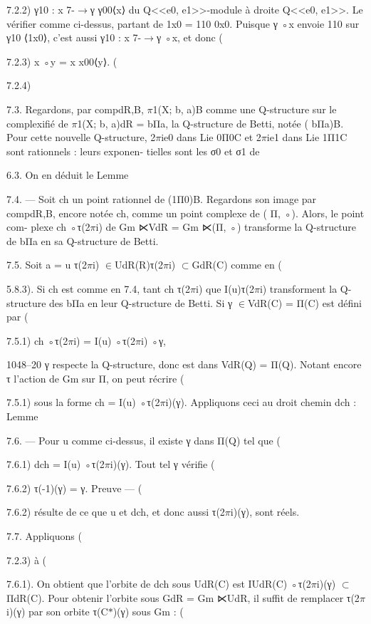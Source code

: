 \documentclass[11pt]{article}
\begin{document}
7.2.2) γ10 : x 7-\(\to\)γ γ00⟨x⟩ du Q<<e0, e1>>-module à droite Q<<e0, e1>>. Le vérifier comme ci-dessus, partant de 1x0 = 110 0x0. Puisque γ ◦x envoie 110 sur γ10 ⟨1x0⟩, c’est aussi γ10 : x 7-\(\to\)γ ◦x, et donc (

7.2.3) x ◦y = x x00⟨y⟩. (

7.2.4) 

7.3. Regardons, par compdR,B, \(\pi\)1(X; b, a)B comme une Q-structure sur le complexifié de \(\pi\)1(X; b, a)dR = bΠa, la Q-structure de Betti, notée ( bΠa)B. Pour cette nouvelle Q-structure, 2\(\pi\)ie0 dans Lie 0Π0C et 2\(\pi\)ie1 dans Lie 1Π1C sont rationnels : leurs exponen- tielles sont les σ0 et σ1 de 

6.3. On en déduit le Lemme 

7.4. --- Soit ch un point rationnel de (1Π0)B. Regardons son image par compdR,B, encore notée ch, comme un point complexe de ( Π, ◦). Alors, le point com- plexe ch ◦τ(2\(\pi\)i) de Gm ⋉VdR = Gm ⋉(Π, ◦) transforme la Q-structure de bΠa en sa Q-structure de Betti. 

7.5. Soit a = u τ(2\(\pi\)i) \(\in\)UdR(R)τ(2\(\pi\)i) \(\subset\)GdR(C) comme en (

5.8.3). Si ch est comme en 7.4, tant ch τ(2\(\pi\)i) que I(u)τ(2\(\pi\)i) transforment la Q-structure des bΠa en leur Q-structure de Betti. Si γ \(\in\)VdR(C) = Π(C) est défini par (

7.5.1) ch ◦τ(2\(\pi\)i) = I(u) ◦τ(2\(\pi\)i) ◦γ,

1048--20 γ respecte la Q-structure, donc est dans VdR(Q) = Π(Q). Notant encore τ l’action de Gm sur Π, on peut récrire (

7.5.1) sous la forme ch = I(u) ◦τ(2\(\pi\)i)(γ). Appliquons ceci au droit chemin dch : Lemme 

7.6. --- Pour u comme ci-dessus, il existe γ dans Π(Q) tel que (

7.6.1) dch = I(u) ◦τ(2\(\pi\)i)(γ). Tout tel γ vérifie (

7.6.2) τ(-1)(γ) = γ. Preuve --- (

7.6.2) résulte de ce que u et dch, et donc aussi τ(2\(\pi\)i)(γ), sont réels. 

7.7. Appliquons (

7.2.3) à (

7.6.1). On obtient que l’orbite de dch sous UdR(C) est IUdR(C) ◦τ(2\(\pi\)i)(γ) \(\subset\)ΠdR(C). Pour obtenir l’orbite sous GdR = Gm ⋉UdR, il suffit de remplacer τ(2\(\pi\)i)(γ) par son orbite τ(C\(*\))(γ) sous Gm : (
\end{document}
